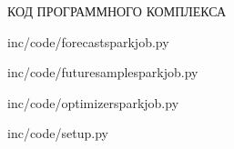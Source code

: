 \centering
КОД ПРОГРАММНОГО КОМПЛЕКСА


    {inc/code/forecastsparkjob.py}


    {inc/code/futuresamplesparkjob.py}


        {inc/code/optimizersparkjob.py}


            {inc/code/setup.py}